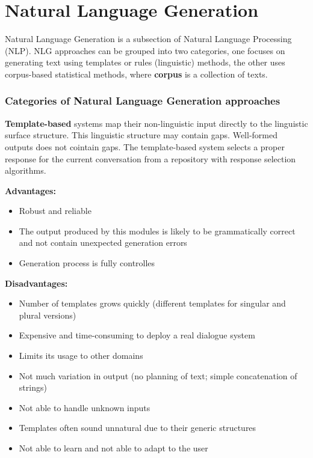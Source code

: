 \chapter{Natural Language Generation}\label{nlg}
Natural Language Generation is a subsection of Natural Language Processing (NLP). 
NLG approaches can be grouped into two categories, one focuses on generating text using templates or rules (linguistic) methods, the other uses corpus-based statistical methods, where \textbf{corpus} is a collection of texts.

\subsection*{Categories of Natural Language Generation approaches}

\textbf{Template-based} systems map their non-linguistic input directly to the linguistic surface structure. This linguistic structure may contain gaps. Well-formed outputs does not cointain gaps.
The template-based system selects a proper response for the current conversation from a repository with response selection algorithms. 

\textbf{Advantages:}
\begin{itemize}
  \item Robust and reliable
  \item The output produced by this modules is likely to be grammatically correct and not contain unexpected generation errors
  \item Generation process is fully controlles
\end{itemize}

\textbf{Disadvantages:}
\begin{itemize}
  \item Number of templates grows quickly (different templates for singular and plural versions)
  \item Expensive and time-consuming to deploy a real dialogue system
  \item Limits its usage to other domains
  \item Not much variation in output (no planning of text; simple concatenation of strings)
  \item Not able to handle unknown inputs 
  \item Templates often sound unnatural due to their generic structures
  \item Not able to learn and not able to adapt to the user
\end{itemize}


